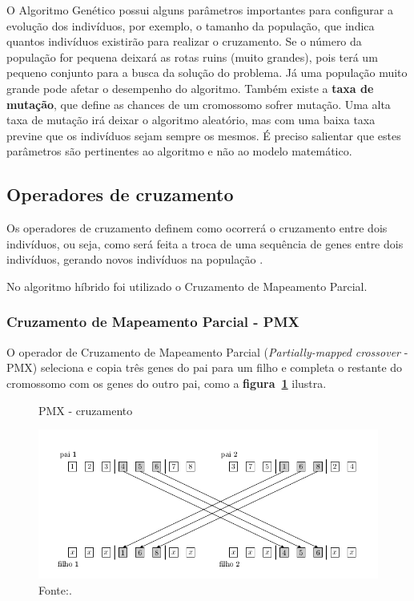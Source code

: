 \documentclass[12pt,openright,a4paper,twoside]{tcc}
\begin{document}
		O Algoritmo Genético possui alguns parâmetros importantes para configurar a evolução dos indivíduos, por exemplo, o tamanho da população, que indica quantos indivíduos existirão para realizar o cruzamento. Se o número da população for pequena deixará as rotas ruins (muito grandes), pois terá um pequeno conjunto para a busca da solução do problema. Já uma população muito grande pode afetar o desempenho do algoritmo. Também  existe a \textbf{taxa de mutação}, que define as chances de um cromossomo sofrer mutação. Uma alta taxa de mutação irá deixar o algoritmo aleatório, mas com uma baixa taxa previne que os indivíduos sejam sempre os mesmos. É preciso salientar que estes parâmetros são pertinentes ao algoritmo e não ao modelo matemático.

		\subsection{Operadores de cruzamento}

			Os operadores de cruzamento definem como ocorrerá o cruzamento entre dois indivíduos, ou seja, como será feita a troca de uma sequência de genes entre dois indivíduos, gerando novos indivíduos na população \cite{0012-pdf}.

			No algoritmo híbrido foi utilizado o Cruzamento de Mapeamento Parcial.

		\subsubsection{Cruzamento de Mapeamento Parcial - PMX} 
			\label{Spmx}
			O operador de Cruzamento de Mapeamento Parcial (\textit{Partially-mapped crossover} - PMX)  seleciona e copia três genes do pai para um filho e completa o restante do cromossomo com os genes do outro pai, como a \textbf{figura~\ref{pmx}} ilustra.

			\begin{figure}[h]
				\centering
                \caption{PMX - cruzamento}
		        \includegraphics[width = 14cm,keepaspectratio]{img/pmx.png}
		        \caption*{Fonte:\cite{0012-pdf}.}
		        \label{pmx}
	   		\end{figure}
\end{document}
